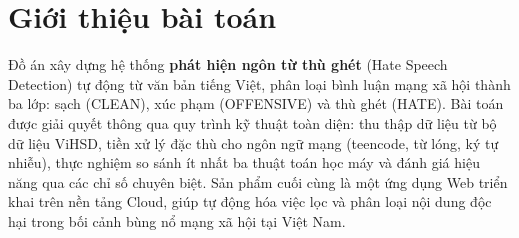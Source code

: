 \section{Giới thiệu bài toán}
Đồ án xây dựng hệ thống \textbf{phát hiện ngôn từ thù ghét} (Hate Speech Detection) tự động từ văn bản tiếng Việt, phân loại bình luận mạng xã hội thành ba lớp: sạch (CLEAN), xúc phạm (OFFENSIVE) và thù ghét (HATE). Bài toán được giải quyết thông qua quy trình kỹ thuật toàn diện: thu thập dữ liệu từ bộ dữ liệu ViHSD, tiền xử lý đặc thù cho ngôn ngữ mạng (teencode, từ lóng, ký tự nhiễu), thực nghiệm so sánh ít nhất ba thuật toán học máy và đánh giá hiệu năng qua các chỉ số chuyên biệt. Sản phẩm cuối cùng là một ứng dụng Web triển khai trên nền tảng Cloud, giúp tự động hóa việc lọc và phân loại nội dung độc hại trong bối cảnh bùng nổ mạng xã hội tại Việt Nam.